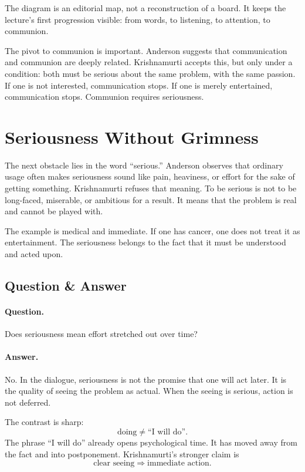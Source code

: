 The diagram is an editorial map, not a reconstruction of a board. It keeps the lecture's first progression visible: from words, to listening, to attention, to communion.

The pivot to communion is important. Anderson suggests that communication and communion are deeply related. Krishnamurti accepts this, but only under a condition: both must be serious about the same problem, with the same passion. If one is not interested, communication stops. If one is merely entertained, communication stops. Communion requires seriousness.

\section{Seriousness Without Grimness}

The next obstacle lies in the word ``serious.'' Anderson observes that ordinary usage often makes seriousness sound like pain, heaviness, or effort for the sake of getting something. Krishnamurti refuses that meaning. To be serious is not to be long-faced, miserable, or ambitious for a result. It means that the problem is real and cannot be played with.

The example is medical and immediate. If one has cancer, one does not treat it as entertainment. The seriousness belongs to the fact that it must be understood and acted upon.

\subsection{Question \& Answer}

\paragraph{Question.}
Does seriousness mean effort stretched out over time?

\paragraph{Answer.}
No. In the dialogue, seriousness is not the promise that one will act later. It is the quality of seeing the problem as actual. When the seeing is serious, action is not deferred.

The contrast is sharp:
\begin{equation}
\text{doing} \neq \text{``I will do''}.
\end{equation}
The phrase ``I will do'' already opens psychological time. It has moved away from the fact and into postponement. Krishnamurti's stronger claim is
\begin{equation}
\text{clear seeing}
\Longrightarrow
\text{immediate action}.
\end{equation}

